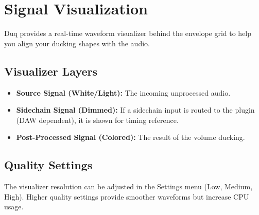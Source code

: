 \chapter{Signal Visualization}
\label{ch:signal_visualization}

Duq provides a real-time waveform visualizer behind the envelope grid to help you align your ducking shapes with the audio.

\section{Visualizer Layers}
\begin{itemize}
    \item \textbf{Source Signal (White/Light):} The incoming unprocessed audio.
    \item \textbf{Sidechain Signal (Dimmed):} If a sidechain input is routed to the plugin (DAW dependent), it is shown for timing reference.
    \item \textbf{Post-Processed Signal (Colored):} The result of the volume ducking.
\end{itemize}

\section{Quality Settings}
The visualizer resolution can be adjusted in the Settings menu (Low, Medium, High). Higher quality settings provide smoother waveforms but increase CPU usage.

